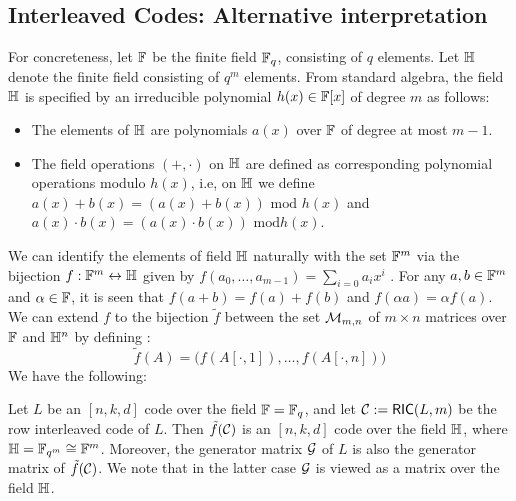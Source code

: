 \subsection{Interleaved Codes: Alternative interpretation}
For concreteness, let $\mathbb{F}$ be the finite field $\mathbb{F}_q$, consisting of $q$
elements. Let $\mathbb{H}$ denote the finite field consisting of $q^m$ elements. From
standard algebra, the field $\mathbb{H}$ is specified by an irreducible polynomial $h(x)\in \mathbb{F}[x]$ of
degree $m$ as follows:
\begin{itemize}
\item The elements of $\mathbb{H}$ are polynomials $a(x)$ over $\mathbb{F}$ of degree at most
$m-1$.
\item The field operations $(+,\cdot)$ on $\mathbb{H}$ are defined as corresponding
polynomial operations modulo $h(x)$, i.e, on $\mathbb{H}$ we define $a(x)+b(x) =
(a(x)+b(x)) \text{ mod } h(x)$ and $a(x)\cdot b(x) = (a(x)\cdot b(x)) \text{ mod
} h(x)$. 
\end{itemize}
We can identify the elements of field $\mathbb{H}$ naturally with the set $\mathbb{F}^m$ via
the bijection $f:\mathbb{F}^m\leftrightarrow \mathbb{H}$ given by
$f(a_0,\ldots,a_{m-1})=\sum_{i=0}a_ix^i$ . For any $a,b\in \mathbb{F}^m$ and $\alpha\in
\mathbb{F}$, it is seen that $f(a+b)=f(a)+f(b)$ and $f(\alpha a)=\alpha f(a)$. We can
extend $f$ to the bijection $\tilde{f}$ between the set $\mathcal{M}_{m,n}$ of $m\times n$
matrices over $\mathbb{F}$ and $\mathbb{H}^n$ by defining :
\begin{equation}\label{lem:bijection}
\tilde{f}(A) = \big(f(A[\cdot,1]),\ldots,f(A[\cdot,n])\big)
\end{equation}
We have the following:
\begin{lemma}\label{lem:correspondence}
Let $L$ be an $[n,k,d]$ code over the field $\mathbb{F}=\mathbb{F}_q$, and let $\mathcal{C} :=
\mathsf{RIC}(L,m)$ be the row interleaved code of $L$. Then $\tilde{f}(\mathcal{C})$ is an
$[n,k,d]$ code over the field $\mathbb{H}$, where $\mathbb{H}=\mathbb{F}_{q^m}\cong \mathbb{F}^m$. Moreover,
the generator matrix $\mathcal{G}$ of $L$ is also the generator matrix of
$\tilde{f}(\mathcal{C})$. We note that in the latter case $\mathcal{G}$ is viewed as a
matrix over the field $\mathbb{H}$.
\end{lemma}

